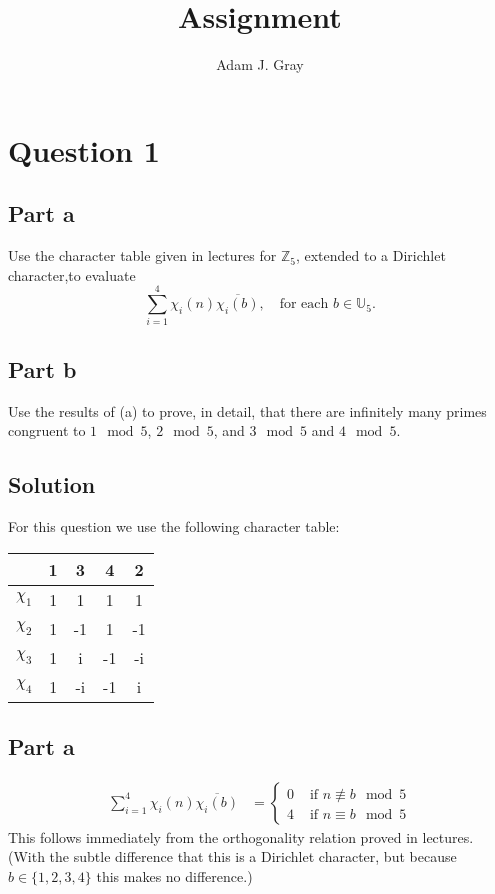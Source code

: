 \documentclass{unswmaths}
\begin{document}
\author{Adam J. Gray}
\subject{Number Theory}
\title{Assignment}

\unswtitle

\section*{Question 1}
\subsection*{Part a}
Use the character table given in lectures for $ \mathbb{Z}_5 $, extended to a Dirichlet character,to evaluate
$$
	\sum_{i=1}^4 \chi_i(n) \overline{ \chi_i(b)}, \ \ \ \text{ for each } b \in \mathbb{U}_5.
$$
\subsection*{Part b}
Use the results of (a) to prove, in detail, that there are infinitely many primes congruent to  $ 1 \mod 5 $,
$ 2 \mod 5 $, and $ 3 \mod 5 $ and $ 4 \mod 5 $.

\subsection*{Solution}
For this question we use the following character table:

\begin{table}[h]
	\centering
	\begin{tabular}{c | c | c | c | c}
		& 1 & 3 & 4 & 2 \\ \hline 
		$\chi_1$ & 1 & 1 & 1 & 1 \\
		\hline
		$\chi_2$ & 1 & -1 & 1 & -1 \\
		\hline
		$\chi_3$ & 1 & i & -1 & -i \\
		\hline
		$\chi_4$ & 1 & -i & -1 & i
	\end{tabular}
\end{table}
	
\subsection*{Part a}
\begin{align*}
	\sum_{i=1}^4 \chi_i(n) \overline{ \chi_i(b)} &=
	\begin{cases}
		0 & \text{ if } n \not\equiv b \mod 5 \\
		4 & \text{ if } n \equiv b \mod 5
	\end{cases}
\end{align*}
This follows immediately from the orthogonality relation proved in lectures. (With the subtle difference that
this is a Dirichlet character, but because $ b \in \{ 1,2,3,4 \} $ this makes no difference.)
\end{document}
